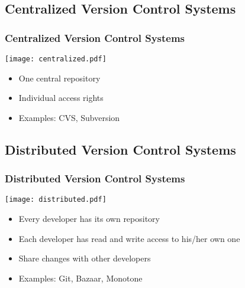 \documentclass{beamer}
\begin{document}
\subsection{Centralized Version Control Systems}
\frame
{
  \frametitle{Centralized Version Control Systems}
  \begin{minipage}{0.5\linewidth}
    \texttt{[image: centralized.pdf]}
  \end{minipage}  
  \begin{minipage}{0.48\linewidth}
    \begin{itemize}
      \item One central repository
      \item Individual access rights
      \item Examples: CVS, Subversion
    \end{itemize}    
  \end{minipage}  
}
\subsection{Distributed Version Control Systems}
\frame
{
  \frametitle{Distributed Version Control Systems}
  \begin{minipage}{0.6\linewidth}
    \texttt{[image: distributed.pdf]}
  \end{minipage}  
  \begin{minipage}{0.38\linewidth}
    \begin{itemize}
      \item Every developer has its own repository
      \item Each developer has read and write access to his/her own one
      \item Share changes with other developers
      \item Examples: Git, Bazaar, Monotone
    \end{itemize}    
  \end{minipage}  
}
\end{document}
